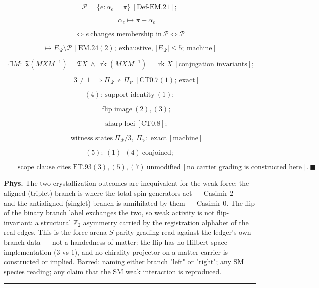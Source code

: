 \begin{theorem}
\[
\mathcal P=\{e:\alpha_e=\pi\}\ [\mathrm{Def\text{-}EM.21}];
\]

\[
\qquad \alpha_e\mapsto\pi-\alpha_e
\]

\[
\iff e\ \text{changes membership in}\ \mathcal P\iff\mathcal P
\]

\[
\mapsto E_{\mathcal R}\setminus\mathcal P\ [\mathrm{EM.24}(2);\ \text{exhaustive},\ |E_{\mathcal R}|\le5;\ \text{machine}]
\]

\[
\neg\exists M:\ \mathfrak T(MXM^{-1})=\mathfrak TX\ \wedge\ \operatorname{rk}(MXM^{-1})=\operatorname{rk}X\ [\text{conjugation invariants}];
\]

\[
\qquad 3\ne1\implies\Pi_{\mathcal R}\not\sim\Pi_{\mathcal V}\ [\mathrm{CT0.7}(1);\ \text{exact}]
\]

\[
(4):\ \text{support identity}\ (1);
\]

\[
\qquad \text{flip image}\ (2),(3);
\]

\[
\qquad \text{sharp loci}\ [\mathrm{CT0.8}];
\]

\[
\qquad \text{witness states}\ \Pi_{\mathcal R}/3,\ \Pi_{\mathcal V}:\ \text{exact}\ [\text{machine}]
\]

\[
(5):\ (1)\text{--}(4)\ \text{conjoined};
\]

\[
\qquad \text{scope clause cites FT.93}(3),(5),(7)\ \text{unmodified}\ [\text{no carrier grading is constructed here}].\ \blacksquare
\]

\textbf{Phys.} The two crystallization outcomes are inequivalent for the weak force: the aligned (triplet) branch is where the total-spin generators act — Casimir $2$ — and the antialigned (singlet) branch is annihilated by them — Casimir $0$. The flip of the binary branch label exchanges the two, so weak activity is not flip-invariant: a structural $\mathbb Z_2$ asymmetry carried by the registration alphabet of the real edges. This is the force-arena $S$-parity grading read against the ledger's own branch data — not a handedness of matter: the flip has no Hilbert-space implementation ($3$ vs $1$), and no chirality projector on a matter carrier is constructed or implied. Barred: naming either branch "left" or "right"; any SM species reading; any claim that the SM weak interaction is reproduced.

\vspace{2pt}\noindent\rule{\textwidth}{0.4pt}\vspace{2pt}

\end{theorem}

